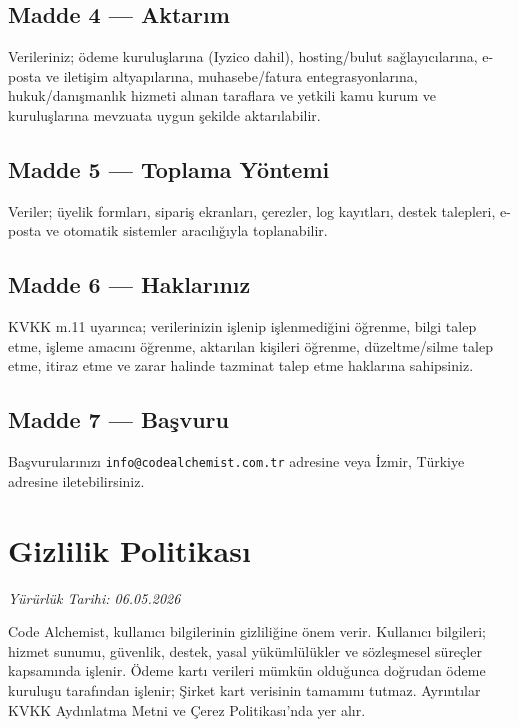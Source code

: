 \documentclass[12pt,a4paper]{article}
\begin{document}
\subsection*{Madde 4 --- Aktarım}
Verileriniz; \"{o}deme kurulu\c{s}lar{\i}na (Iyzico dahil), hosting/bulut sa\u{g}lay{\i}c{\i}lar{\i}na,
e-posta ve ileti\c{s}im altyap{\i}lar{\i}na, muhasebe/fatura entegrasyonlar{\i}na, hukuk/dan{\i}\c{s}manl{\i}k
hizmeti al{\i}nan taraflara ve yetkili kamu kurum ve kurulu\c{s}lar{\i}na mevzuata uygun \c{s}ekilde
aktarılabilir.

\subsection*{Madde 5 --- Toplama Y\"{o}ntemi}
Veriler; \"{u}yelik formlar{\i}, sipari\c{s} ekranlar{\i}, \c{c}erezler, log kay{\i}tlar{\i}, destek talepleri,
e-posta ve otomatik sistemler arac{\i}l{\i}\u{g}{\i}yla toplanabilir.

\subsection*{Madde 6 --- Haklar{\i}n{\i}z}
KVKK m.11 uyar{\i}nca; verilerinizin i\c{s}lenip i\c{s}lenmedi\u{g}ini \"{o}\u{g}renme, bilgi talep etme,
i\c{s}leme amac{\i}n{\i} \"{o}\u{g}renme, aktarılan ki\c{s}ileri \"{o}\u{g}renme, d\"{u}zeltme/silme talep etme,
itiraz etme ve zarar halinde tazminat talep etme haklar{\i}na sahipsiniz.

\subsection*{Madde 7 --- Ba\c{s}vuru}
Ba\c{s}vurular{\i}n{\i}z{\i} \texttt{info@codealchemist.com.tr} adresine veya \.{I}zmir, T\"{u}rkiye adresine
iletebilirsiniz.

\section{Gizlilik Politikas{\i}}
\textit{Y\"{u}r\"{u}rl\"{u}k Tarihi: 06.05.2026}

Code Alchemist, kullan{\i}c{\i} bilgilerinin gizlili\u{g}ine \"{o}nem verir. Kullan{\i}c{\i} bilgileri;
hizmet sunumu, g\"{u}venlik, destek, yasal y\"{u}k\"{u}ml\"{u}l\"{u}kler ve s\"{o}zle\c{s}mesel s\"{u}re\c{c}ler
kapsam{\i}nda i\c{s}lenir. \"{O}deme kart{\i} verileri m\"{u}mk\"{u}n oldu\u{g}unca do\u{g}rudan \"{o}deme kurulu\c{s}u
taraf{\i}ndan i\c{s}lenir; \c{S}irket kart verisinin tamam{\i}n{\i} tutmaz. Ayr{\i}nt{\i}lar KVKK Ayd{\i}nlatma
Metni ve \c{C}erez Politikas{\i}'nda yer al{\i}r.
\end{document}
